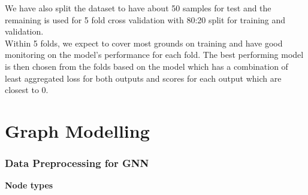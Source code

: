 \documentclass{report} %
\begin{document}
We have also split the dataset to have about 50 samples for test and the remaining is used for 5 fold cross validation with 80:20 split for training and validation. \\
Within 5 folds, we expect to cover most grounds on training and have good monitoring on the model's performance for each fold.
The best performing model is then chosen from the folds based on the model which has a combination of least aggregated loss for both outputs and scores for each output which are closest to 0.


\chapter*{Graph Modelling} 

\subsection*{Data Preprocessing for \ac{GNN}}


\textbf{Node types}
\end{document}
